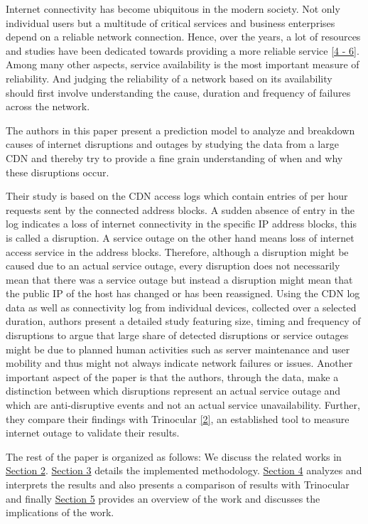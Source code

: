
Internet connectivity has become ubiquitous in the modern society. Not only individual users but a multitude of critical services and business enterprises depend on a reliable network connection. Hence, over the years, a lot of resources and studies have been dedicated towards providing a more reliable service \hyperlink {K4}{[4 - 6]}. Among many other aspects, service availability is the most important measure of reliability. And judging the reliability of a network based on its availability should first involve understanding the cause, duration and frequency of failures across the network.
  
The authors in this paper present a prediction model to analyze and breakdown causes of internet disruptions and outages by studying the data from a large CDN and thereby try to provide a fine grain understanding of when and why these disruptions occur. 

Their study is based on the CDN access logs which contain entries of per hour requests sent by the connected address blocks. A sudden absence of entry in the log indicates a loss of internet connectivity in the specific IP address blocks, this is called a disruption. A service outage on the other hand means loss of internet access service in the address blocks. Therefore, although a disruption might be caused due to an actual service outage, every disruption does not necessarily mean that there was a service outage but instead a disruption might mean that the public IP of the host has changed or has been reassigned. Using the CDN log data as well as connectivity log from individual devices, collected over a selected duration, authors present a detailed study featuring size, timing and frequency of disruptions to argue that large share of detected disruptions or service outages might be due to planned human activities such as server maintenance and user mobility and thus might not always indicate network failures or issues. Another important aspect of the paper is that the authors, through the data, make a distinction between which disruptions represent an actual service outage and which are anti-disruptive events and not an actual service unavailability. Further, they compare their findings with Trinocular \hyperlink {K2}{[2]}, an established tool to measure internet outage to validate their results.

The rest of the paper is organized as follows: We discuss the related works in \hyperref[RW]{Section 2}. \hyperref[M]{Section 3} details the implemented methodology. \hyperref[RandEv]{Section 4} analyzes and interprets the results and also presents a comparison of results with Trinocular and finally \hyperref[DC]{Section 5} provides an overview of the work and discusses the implications of the work.



